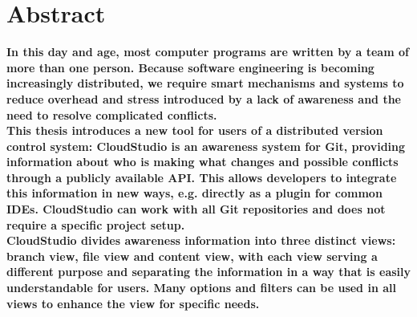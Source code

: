 


\chapter*{Abstract}

\textbf{In this day and age, most computer programs are written by a team of more than one person. Because software engineering is becoming increasingly distributed, we require smart mechanisms and systems to reduce overhead and stress introduced by a lack of awareness and the need to resolve complicated conflicts.} \\

\textbf{This thesis introduces a new tool for users of a distributed version control system: CloudStudio is an awareness system for Git, providing information about who is making what changes and possible conflicts through a publicly available API. This allows developers to integrate this information in new ways, e.g. directly as a plugin for common IDEs. CloudStudio can work with all Git repositories and does not require a specific project setup.} \\

\textbf{CloudStudio divides awareness information into three distinct views: branch view, file view and content view, with each view serving a different purpose and separating the information in a way that is easily understandable for users. Many options and filters can be used in all views to enhance the view for specific needs.}


